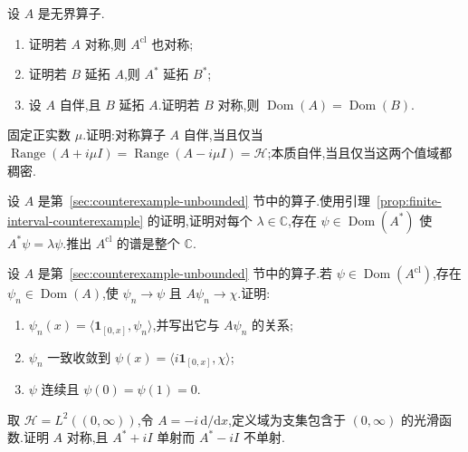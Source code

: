\begin{exercise}[延拓与伴随]\label{ex:extension-adjoint-properties}
设 \(A\) 是无界算子.
\begin{enumerate}[label=(\alph*)]
\item 证明若 \(A\) 对称,则 \(A^{\mathrm{cl}}\) 也对称;
\item 证明若 \(B\) 延拓 \(A\),则 \(A^{*}\) 延拓 \(B^{*}\);
\item 设 \(A\) 自伴,且 \(B\) 延拓 \(A\).证明若 \(B\) 对称,则 \(\operatorname{Dom}(A)=\operatorname{Dom}(B)\).
\end{enumerate}
\end{exercise}

\begin{exercise}[缩放后的自伴性判据]\label{ex:scaled-selfadjoint-criterion}
固定正实数 \(\mu\).证明:对称算子 \(A\) 自伴,当且仅当 \(\operatorname{Range}(A+i\mu I)=\operatorname{Range}(A-i\mu I)=\mathcal{H}\);本质自伴,当且仅当这两个值域都稠密.
\end{exercise}

\begin{exercise}[有限区间反例的谱]\label{ex:finite-interval-adjoint-spectrum}
设 \(A\) 是第~\ref{sec:counterexample-unbounded} 节中的算子.使用引理~\ref{prop:finite-interval-counterexample} 的证明,证明对每个 \(\lambda\in\mathbb{C}\),存在 \(\psi\in\operatorname{Dom}(A^{*})\) 使 \(A^{*}\psi=\lambda\psi\).推出 \(A^{\mathrm{cl}}\) 的谱是整个 \(\mathbb{C}\).
\end{exercise}

\begin{exercise}[闭包中的边界条件]\label{ex:finite-interval-closure-boundary}
设 \(A\) 是第~\ref{sec:counterexample-unbounded} 节中的算子.若 \(\psi\in\operatorname{Dom}(A^{\mathrm{cl}})\),存在 \(\psi_{n}\in\operatorname{Dom}(A)\),使 \(\psi_{n}\to\psi\) 且 \(A\psi_{n}\to\chi\).证明:
\begin{enumerate}[label=(\alph*)]
\item \(\psi_{n}(x)=\langle\mathbf{1}_{[0,x]},\psi_{n}\rangle\),并写出它与 \(A\psi_{n}\) 的关系;
\item \(\psi_{n}\) 一致收敛到 \(\psi(x)=\langle i\mathbf{1}_{[0,x]},\chi\rangle\);
\item \(\psi\) 连续且 \(\psi(0)=\psi(1)=0\).
\end{enumerate}
\end{exercise}

\begin{exercise}[半直线上的动量算子]\label{ex:halfline-momentum-adjoint}
取 \(\mathcal{H}=L^{2}((0,\infty))\),令 \(A=-i\,\mathrm{d}/\mathrm{d}x\),定义域为支集包含于 \((0,\infty)\) 的光滑函数.证明 \(A\) 对称,且 \(A^{*}+iI\) 单射而 \(A^{*}-iI\) 不单射.
\end{exercise}

